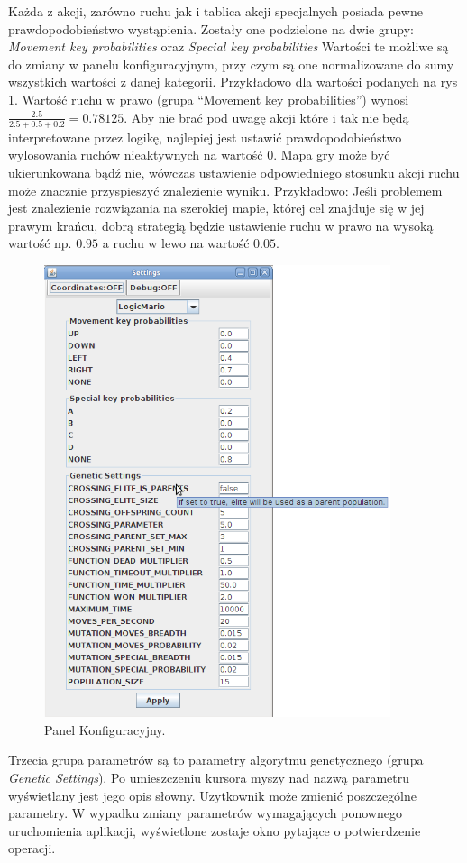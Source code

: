 \begin{par}
	Każda z akcji, zarówno ruchu jak i tablica akcji specjalnych posiada pewne prawdopodobieństwo wystąpienia.
	Zostały one podzielone na dwie grupy: \textit{Movement key probabilities} oraz \textit{Special key probabilities}
	Wartości te możliwe są do zmiany w panelu konfiguracyjnym, przy czym są one normalizowane do sumy wszystkich wartości z danej kategorii.
	Przykładowo dla wartości podanych na rys \ref{fig:config1}. Wartość ruchu w prawo (grupa ``Movement key probabilities'') wynosi $\frac{2.5}{2.5+0.5+0.2}=0.78125$.
	Aby nie brać pod uwagę akcji które i tak nie będą interpretowane przez logikę, najlepiej jest ustawić prawdopodobieństwo wylosowania ruchów nieaktywnych na wartość $0$. 
	Mapa gry może być ukierunkowana bądź nie, wówczas ustawienie odpowiedniego stosunku akcji ruchu może znacznie przyspieszyć znalezienie wyniku. Przykładowo: Jeśli problemem jest znalezienie rozwiązania na szerokiej mapie, której cel znajduje się w jej prawym krańcu, dobrą strategią będzie ustawienie ruchu w prawo na wysoką wartość np. $0.95$ a ruchu w lewo na wartość $0.05$.
	\begin{figure}[!h]
		\centering
		\includegraphics[width=4in]{obrazki/config1.png}
		\caption{Panel Konfiguracyjny.}
		\label{fig:config1}
	\end{figure}
	Trzecia grupa parametrów są to parametry algorytmu genetycznego (grupa \textit{Genetic Settings}). Po umieszczeniu kursora myszy nad nazwą parametru wyświetlany jest jego opis słowny. Uzytkownik może zmienić poszczególne parametry. W wypadku zmiany parametrów wymagających ponownego uruchomienia aplikacji, wyświetlone zostaje okno pytające o potwierdzenie operacji.

\end{par}
